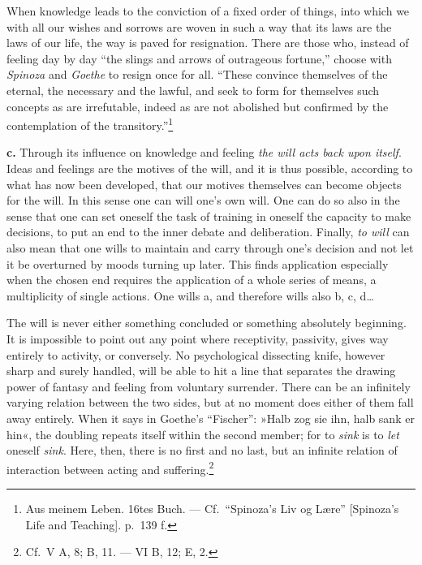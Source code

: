 \documentclass[12pt,a4paper]{book}
\newcommand{\opage}[1]{\marginnote{\footnotesize\textit{[#1]}}}
\begin{document}
When knowledge leads to the conviction of a fixed order of things, into
which we with all our wishes and sorrows are woven in such a way that its
laws are the laws of our life, the way is paved for resignation. There
are those who, instead of feeling day by day ``the slings and arrows of
outrageous fortune,'' choose with \emph{Spinoza} and \emph{Goethe} to
resign once for all. ``These convince themselves of the eternal, the
necessary and the lawful, and seek to form for themselves such concepts
as are irrefutable, indeed as are not abolished but confirmed by the
contemplation
of the transitory.''\footnote{Aus meinem Leben. 16tes Buch. --- Cf.\
``Spinoza’s Liv og Lære'' [Spinoza's Life and Teaching]. p.~139 f.}

\textbf{c.} Through its influence on knowledge and feeling \emph{the will
acts back upon itself}. Ideas and feelings are the motives of the will,
and it is thus possible, according to what has now been developed, that
our motives themselves can become objects for the will. In this sense one
can will one's own will. One can do so also in the sense that one can set
oneself the task of training in oneself the capacity to make decisions, to
put an end to the inner debate and deliberation. Finally, \emph{to will}
can also mean that one wills to maintain and carry through one's decision
and not let it be overturned by moods turning up
\opage{391}later. This finds application especially when the chosen end
requires the application of a whole series of means, a multiplicity of
single actions. One wills a, and therefore wills also b, c, d\ldots

The will is never either something concluded or something absolutely
beginning. It is impossible to point out any point where receptivity,
passivity, gives way entirely to activity, or conversely. No
psychological dissecting knife, however sharp and surely handled, will be
able to hit a line that separates the drawing power of fantasy and feeling
from voluntary surrender. There can be an infinitely varying relation
between the two sides, but at no moment does either of them fall away
entirely. When it says in Goethe's ``Fischer'': »Halb zog sie ihn, halb
sank er hin«, the doubling repeats itself within the second member; for
to \emph{sink} is to \emph{let} oneself \emph{sink}. Here, then, there is
no first and no last, but an infinite relation of interaction between
acting and suffering.\footnote{Cf.\ V A, 8; B, 11. --- VI B, 12; E, 2.}
\end{document}
